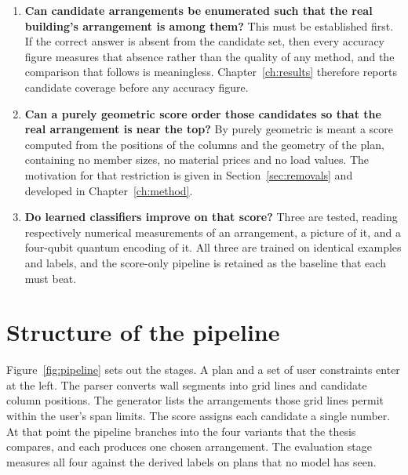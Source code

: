 \begin{enumerate}
\item \textbf{Can candidate arrangements be enumerated such that the real
building's arrangement is among them?} This must be established first. If
the correct answer is absent from the candidate set, then every accuracy
figure measures that absence rather than the quality of any method, and
the comparison that follows is meaningless. Chapter~\ref{ch:results}
therefore reports candidate coverage before any accuracy figure.

\item \textbf{Can a purely geometric score order those candidates so that
the real arrangement is near the top?} By purely geometric is meant a
score computed from the positions of the columns and the geometry of the
plan, containing no member sizes, no material prices and no load values.
The motivation for that restriction is given in
Section~\ref{sec:removals} and developed in Chapter~\ref{ch:method}.

\item \textbf{Do learned classifiers improve on that score?} Three are
tested, reading respectively numerical measurements of an arrangement, a
picture of it, and a four-qubit quantum encoding of it. All three are
trained on identical examples and labels, and the score-only pipeline is
retained as the baseline that each must beat.
\end{enumerate}

\section{Structure of the pipeline}
\label{sec:pipeline}

Figure~\ref{fig:pipeline} sets out the stages. A plan and a set of user
constraints enter at the left. The parser converts wall segments into grid
lines and candidate column positions. The generator lists the arrangements
those grid lines permit within the user's span limits. The score assigns
each candidate a single number. At that point the pipeline branches into
the four variants that the thesis compares, and each produces one chosen
arrangement. The evaluation stage measures all four against the derived
labels on plans that no model has seen.

